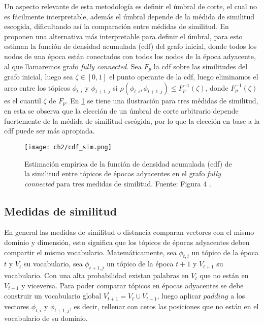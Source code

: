 \documentclass[letterpaper,12pt,oneside]{book} %
\begin{document}
Un aspecto relevante de esta metodología es definir el úmbral de corte, el cual no es fácilmente interpretable, además el úmbral depende de la médida de similitud escogida, dificultando así la comparación entre médidas de similitud. En \citep{beykikhoshk2018discovering} proponen una alternativa más interpretable para definir el úmbral, para esto estiman la función de densidad acumulada (cdf) del grafo inicial, donde todos los nodos de una época están conectados con todos los nodos de la época adyacente, al que llamaremos grafo \textit{fully connected}. Sea $F_{p}$ la cdf sobre las similitudes del grafo inicial, luego sea $\zeta \in [0,1]$ el punto operante de la cdf, luego eliminamos el arco entre los tópicos $\phi_{t,i}$ y $\phi_{t+1,j}$ si $\rho(\phi_{t,i}, \phi_{t+1,j})\leq F_{p}^{-1}(\zeta)$, donde  $F_{p}^{-1}(\zeta)$ es el cuantil $\zeta$ de $F_{p}$. En \ref{img:cdf_sim} se tiene una ilustración para tres médidas de similitud, en esta se observa que la elección de un úmbral de corte arbitrario depende fuertemente de la médida de similitud escógida, por lo que la elección en base a la cdf puede ser más apropiada.

\begin{figure}
    \centering
    \texttt{[image: ch2/cdf\_sim.png]}
    \caption{Estimación empírica de la función de densidad acumulada (cdf) de la similitud entre tópicos de épocas adyacentes en el grafo \textit{fully connected} para tres medidas de similitud. Fuente: Figura 4 \citep{beykikhoshk2018discovering}.}
    \label{img:cdf_sim}
\end{figure}

\subsection{Medidas de similitud}

En general las medidas de similitud o distancia comparan vectores con el mismo dominio y dimensión, esto significa que los tópicos de épocas adyacentes deben compartir el mismo vocabulario. Matemáticamente, sea $\phi_{t, i}$ un tópico de la época $t$ y $V_{t}$ su vocabulario, sea  $\phi_{t+1, j}$ un tópico de la época $t+1$ y $V_{t+1}$ su vocabulario. Con una alta probabilidad existan palabras en $V_{t}$ que no están en $V_{t+1}$ y viceversa. Para poder comparar tópicos en épocas adyacentes se debe construir un vocabulario global $V_{t+1}^{'}=V_{t}\cup V_{t+1}$, luego aplicar $padding$ a los vectores $\phi_{t, i}$ y $\phi_{t+1, j}$, es decir, rellenar con ceros las posiciones que no están en el vocabulario de su dominio.\\
\end{document}
